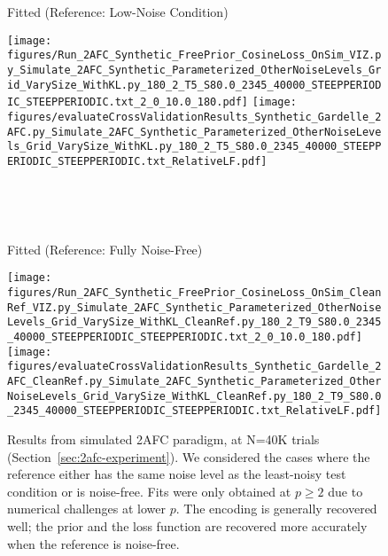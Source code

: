 \documentclass[si.tex]{subfiles}
\begin{document}
\begin{figure}
\ \ 

\ \ 


Fitted (Reference: Low-Noise Condition)

\texttt{[image: figures/Run\_2AFC\_Synthetic\_FreePrior\_CosineLoss\_OnSim\_VIZ.py\_Simulate\_2AFC\_Synthetic\_Parameterized\_OtherNoiseLevels\_Grid\_VarySize\_WithKL.py\_180\_2\_T5\_S80.0\_2345\_40000\_STEEPPERIODIC\_STEEPPERIODIC.txt\_2\_0\_10.0\_180.pdf]}
\texttt{[image: figures/evaluateCrossValidationResults\_Synthetic\_Gardelle\_2AFC.py\_Simulate\_2AFC\_Synthetic\_Parameterized\_OtherNoiseLevels\_Grid\_VarySize\_WithKL.py\_180\_2\_T5\_S80.0\_2345\_40000\_STEEPPERIODIC\_STEEPPERIODIC.txt\_RelativeLF.pdf]}

\ \ 

\ \ 

Fitted (Reference: Fully Noise-Free)

\texttt{[image: figures/Run\_2AFC\_Synthetic\_FreePrior\_CosineLoss\_OnSim\_CleanRef\_VIZ.py\_Simulate\_2AFC\_Synthetic\_Parameterized\_OtherNoiseLevels\_Grid\_VarySize\_WithKL\_CleanRef.py\_180\_2\_T9\_S80.0\_2345\_40000\_STEEPPERIODIC\_STEEPPERIODIC.txt\_2\_0\_10.0\_180.pdf]}
\texttt{[image: figures/evaluateCrossValidationResults\_Synthetic\_Gardelle\_2AFC\_CleanRef.py\_Simulate\_2AFC\_Synthetic\_Parameterized\_OtherNoiseLevels\_Grid\_VarySize\_WithKL\_CleanRef.py\_180\_2\_T9\_S80.0\_2345\_40000\_STEEPPERIODIC\_STEEPPERIODIC.txt\_RelativeLF.pdf]}



\caption{Results from simulated 2AFC paradigm, at N=40K trials (Section~\ref{sec:2afc-experiment}). We considered the cases where the reference either has the same noise level as the least-noisy test condition or is noise-free. Fits were only obtained at $p \geq 2$ due to numerical challenges at lower $p$. The encoding is generally recovered well; the prior and the loss function are recovered more accurately when the reference is noise-free.}\label{fig:2afc}

\end{figure}
\end{document}
